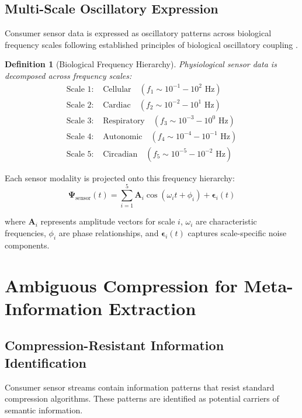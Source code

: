 \documentclass[12pt,a4paper]{article}
\newtheorem{definition}{Definition}
\begin{document}
\subsection{Multi-Scale Oscillatory Expression}

Consumer sensor data is expressed as oscillatory patterns across biological frequency scales following established principles of biological oscillatory coupling \cite{glass2001synchronization,strogatz2000nonlinear}.

\begin{definition}[Biological Frequency Hierarchy]
Physiological sensor data is decomposed across frequency scales:
\begin{align}
\text{Scale 1: } &\text{Cellular} \quad (f_1 \sim 10^{-1}-10^2 \text{ Hz}) \\
\text{Scale 2: } &\text{Cardiac} \quad (f_2 \sim 10^{-2}-10^1 \text{ Hz}) \\
\text{Scale 3: } &\text{Respiratory} \quad (f_3 \sim 10^{-3}-10^0 \text{ Hz}) \\
\text{Scale 4: } &\text{Autonomic} \quad (f_4 \sim 10^{-4}-10^{-1} \text{ Hz}) \\
\text{Scale 5: } &\text{Circadian} \quad (f_5 \sim 10^{-5}-10^{-2} \text{ Hz})
\end{align}
\end{definition}

Each sensor modality is projected onto this frequency hierarchy:
\begin{equation}
\mathbf{\Psi}_{\text{sensor}}(t) = \sum_{i=1}^{5} \mathbf{A}_i \cos(\omega_i t + \phi_i) + \mathbf{\epsilon}_i(t)
\end{equation}

where $\mathbf{A}_i$ represents amplitude vectors for scale $i$, $\omega_i$ are characteristic frequencies, $\phi_i$ are phase relationships, and $\mathbf{\epsilon}_i(t)$ captures scale-specific noise components.

\section{Ambiguous Compression for Meta-Information Extraction}

\subsection{Compression-Resistant Information Identification}

Consumer sensor streams contain information patterns that resist standard compression algorithms. These patterns are identified as potential carriers of semantic information.
\end{document}

